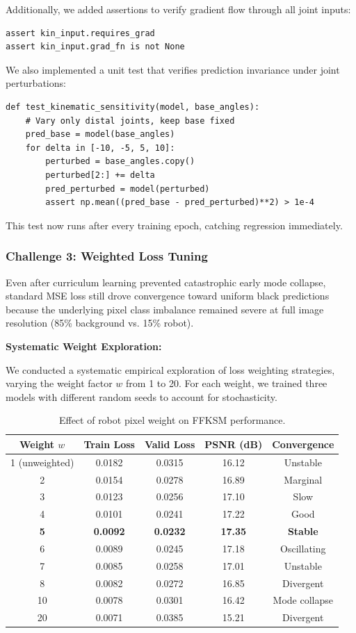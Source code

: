 \documentclass[12pt,a4paper,oneside]{report}
\begin{document}
Additionally, we added assertions to verify gradient flow through all joint inputs:
\begin{verbatim}
assert kin_input.requires_grad
assert kin_input.grad_fn is not None
\end{verbatim}

We also implemented a unit test that verifies prediction invariance under joint perturbations:

\begin{verbatim}
def test_kinematic_sensitivity(model, base_angles):
    # Vary only distal joints, keep base fixed
    pred_base = model(base_angles)
    for delta in [-10, -5, 5, 10]:
        perturbed = base_angles.copy()
        perturbed[2:] += delta
        pred_perturbed = model(perturbed)
        assert np.mean((pred_base - pred_perturbed)**2) > 1e-4
\end{verbatim}

This test now runs after every training epoch, catching regression immediately.

\subsubsection{Challenge 3: Weighted Loss Tuning}

Even after curriculum learning prevented catastrophic early mode collapse, standard MSE loss still drove convergence toward uniform black predictions because the underlying pixel class imbalance remained severe at full image resolution (85\% background vs. 15\% robot).

\textbf{Systematic Weight Exploration:}

We conducted a systematic empirical exploration of loss weighting strategies, varying the weight factor $w$ from 1 to 20. For each weight, we trained three models with different random seeds to account for stochasticity.

\begin{table}[H]
\centering
\caption{Effect of robot pixel weight on FFKSM performance.}
\label{tab:weight_tuning}
\begin{tabular}{ccccc}
\toprule
Weight $w$ & Train Loss & Valid Loss & PSNR (dB) & Convergence \\
\midrule
1 (unweighted) & 0.0182 & 0.0315 & 16.12 & Unstable \\
2 & 0.0154 & 0.0278 & 16.89 & Marginal \\
3 & 0.0123 & 0.0256 & 17.10 & Slow \\
4 & 0.0101 & 0.0241 & 17.22 & Good \\
\textbf{5} & \textbf{0.0092} & \textbf{0.0232} & \textbf{17.35} & \textbf{Stable} \\
6 & 0.0089 & 0.0245 & 17.18 & Oscillating \\
7 & 0.0085 & 0.0258 & 17.01 & Unstable \\
8 & 0.0082 & 0.0272 & 16.85 & Divergent \\
10 & 0.0078 & 0.0301 & 16.42 & Mode collapse \\
20 & 0.0071 & 0.0385 & 15.21 & Divergent \\
\bottomrule
\end{tabular}
\end{table}
\end{document}
